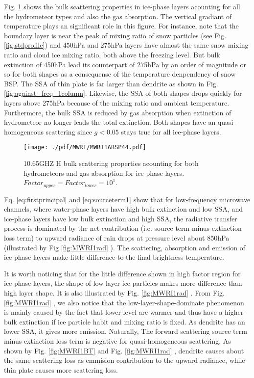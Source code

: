 Fig. \ref{fig:MWRI1ABSP44} shows the bulk scattering properties in ice-phase layers acounting for all the hydrometeor types and also the
gas absorption. The vertical gradiant of temperature plays an significant role in this figure. For instance, note that the boundary layer is near 
the peak of mixing ratio of snow particles (see Fig. \ref{fig:stdprofile}) and 450hPa and 275hPa layers have almost the same snow mixing ratio 
and cloud ice mixing ratio, both above the freezing level. But bulk extinction of 450hPa lead its counterpart of 275hPa by an order of magnitude or so
for both shapes as a consequense of the temperature denpendency of snow BSP.
The SSA of thin plate is far larger than dendrite as shown in Fig. \ref{fig:against_freq_1column}. Likewise, the SSA of both shapes drops quickly
for layers above 275hPa because of the mixing ratio and ambient temperature. 
Furthermore, the bulk SSA is reduced by gas absorption when extinction of hydrometeor no longer leads the total extinction.
Both shapes have an quasi-homogeneous scattering since $g < 0.05$ stays true for all ice-phase layers.

\begin{figure}[hbtp] 
\centering
\texttt{[image: ./pdf/MWRI/MWRI1ABSP44.pdf]}
\caption{10.65GHZ H bulk scattering properties acounting for both hydrometeors and gas absorption for ice-phase layers.
$Factor_{upper} = Factor_{lower} = 10^{1}$.}
\label{fig:MWRI1ABSP44}
\end{figure}

Eq. \ref{eq:firstprincipal} and \ref{eq:sourceterm1} show that for low-frequency microwave channels, where water-phase layers have high bulk extinction and low SSA,
and ice-phase layers have low bulk extinction and high SSA, the radiative transfer process is dominated by the net contribution (i.e. source term minus extinction loss term) to 
upward radiance of rain drops at pressure level about 850hPa (illustrated by Fig \ref{fig:MWRI1rad} ). 
The scattering, absorption and emission of ice-phase layers make little difference to the final brightness temperature.

It is worth noticing that for the little difference shown in high factor region for ice phase layers, the shape of low layer ice particles
makes more difference than high layer shape. It is also illustrated by Fig. \ref{fig:MWRI1rad} .
From Fig. \ref{fig:MWRI1rad} , we also notice that the low-layer-shape-dominate phenomenon is mainly 
caused by the fact that lower-level are warmer and thus have a higher bulk extinction if ice particle habit and mixing ratio is fixed. 
As dendrite has an lower SSA, it gives more emission.
Naturally, The forward scattering source term minus extinction loss term is negative for quasi-homogeneous scattering.
As shown by Fig. \ref{fig:MWRI1BT} and Fig. \ref{fig:MWRI1rad} , dendrite causes about the same scattering loss as emmision contribution
to the upward radiance, while thin plate causes more scattering loss.


